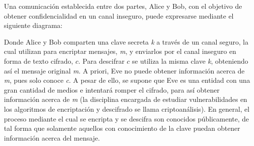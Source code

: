 Una comunicación establecida entre dos partes, Alice y Bob, con el objetivo de obtener confidencialidad en un canal inseguro, puede expresarse mediante el siguiente diagrama:

\begin{center}
\end{center}

\noindent Donde Alice y Bob comparten una clave secreta \textit{k} a través de un canal seguro, la cual utilizan para encriptar mensajes, \textit{m}, y enviarlos por el canal inseguro en forma de  texto cifrado, $c$. Para descifrar $c$ se utiliza la misma clave \textit{k}, obteniendo así el mensaje original \textit{m}. A priori, Eve no puede obtener información acerca de \textit{m}, pues solo conoce \textit{c}. A pesar de ello, se supone que Eve es una entidad con una gran cantidad de medios e intentará romper el cifrado, para así obtener información acerca de \textit{m} (la disciplina encargada de estudiar vulnerabilidades en los algoritmos de encriptación y descifrado se llama criptoanálisis). En general, el proceso mediante el cual se encripta y se descifra son conocidos públicamente, de tal forma que solamente aquellos con conocimiento de la clave puedan obtener información acerca del mensaje.

